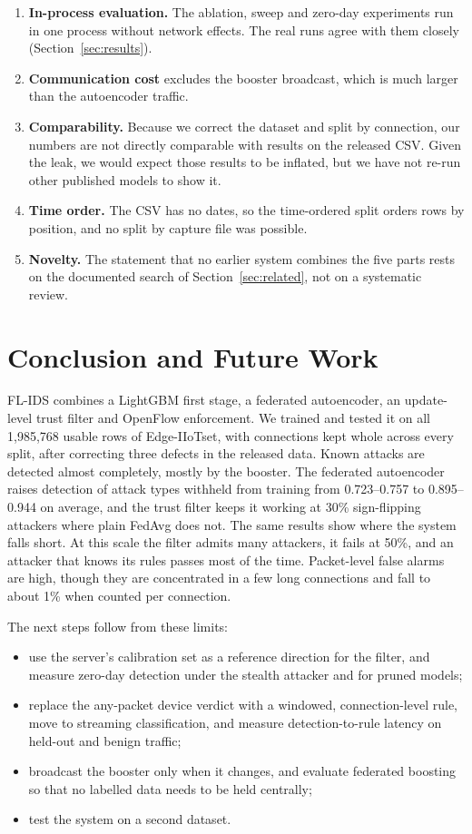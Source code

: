\begin{enumerate}
  \item \textbf{In-process evaluation.} The ablation, sweep and zero-day experiments run in one process without network effects. The real runs agree with them closely (Section~\ref{sec:results}).
  \item \textbf{Communication cost} excludes the booster broadcast, which is much larger than the autoencoder traffic.
  \item \textbf{Comparability.} Because we correct the dataset and split by connection, our numbers are not directly comparable with results on the released CSV. Given the leak, we would expect those results to be inflated, but we have not re-run other published models to show it.
  \item \textbf{Time order.} The CSV has no dates, so the time-ordered split orders rows by position, and no split by capture file was possible.
  \item \textbf{Novelty.} The statement that no earlier system combines the five parts rests on the documented search of Section~\ref{sec:related}, not on a systematic review.
\end{enumerate}

\section{Conclusion and Future Work}
\label{sec:conclusion}
FL-IDS combines a LightGBM first stage, a federated autoencoder, an update-level trust filter and OpenFlow enforcement. We trained and tested it on all 1,985,768 usable rows of Edge-IIoTset, with connections kept whole across every split, after correcting three defects in the released data. Known attacks are detected almost completely, mostly by the booster. The federated autoencoder raises detection of attack types withheld from training from 0.723--0.757 to 0.895--0.944 on average, and the trust filter keeps it working at 30\% sign-flipping attackers where plain FedAvg does not. The same results show where the system falls short. At this scale the filter admits many attackers, it fails at 50\%, and an attacker that knows its rules passes most of the time. Packet-level false alarms are high, though they are concentrated in a few long connections and fall to about 1\% when counted per connection.

The next steps follow from these limits:
\begin{itemize}
  \item use the server's calibration set as a reference direction for the filter, and measure zero-day detection under the stealth attacker and for pruned models;
  \item replace the any-packet device verdict with a windowed, connection-level rule, move to streaming classification, and measure detection-to-rule latency on held-out and benign traffic;
  \item broadcast the booster only when it changes, and evaluate federated boosting so that no labelled data needs to be held centrally;
  \item test the system on a second dataset.
\end{itemize}

